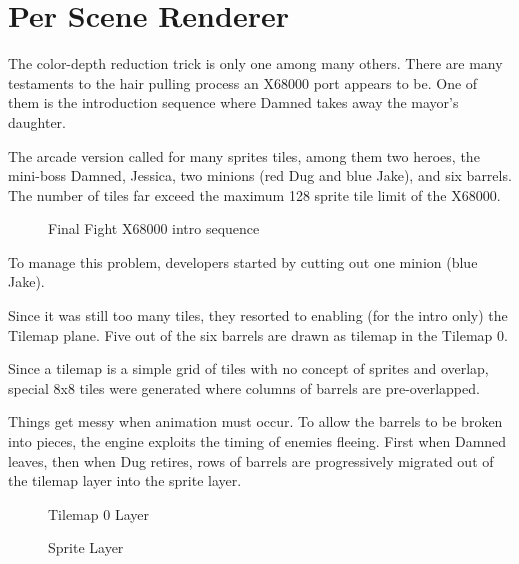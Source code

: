 \pagebreak

\section{Per Scene Renderer}

The color-depth reduction trick is only one among many others. There are many testaments to the hair pulling process an X68000 port appears to be. One of them is the introduction sequence where Damned takes away the mayor's daughter.

The arcade version called for many sprites tiles, among them two heroes, the mini-boss Damned, Jessica, two minions (red Dug and blue Jake), and six barrels. The number of tiles far exceed the maximum 128 sprite tile limit of the X68000.

\begin{figure}[H]
\caption*{Final Fight X68000 intro sequence}
\end{figure}

To manage this problem, developers started by cutting out one minion (blue Jake). 

Since it was still too many tiles, they resorted to enabling (for the intro only) the Tilemap plane. Five out of the six barrels are drawn as tilemap in the Tilemap 0.

Since a tilemap is a simple grid of tiles with no concept of sprites and overlap, special 8x8 tiles were generated where columns of barrels are pre-overlapped.

Things get messy when animation must occur. To allow the barrels to be broken into pieces, the engine exploits the timing of enemies fleeing. First when Damned leaves, then when Dug retires, rows of barrels are progressively migrated out of the tilemap layer into the sprite layer. 



\begin{minipage}[!t]{0.49\linewidth}
\vspace{-3mm}
  \begin{figure}[H]
  \caption*{Tilemap 0 Layer}
  \end{figure}
\end{minipage}%
\hfill
\begin{minipage}[!t]{0.49\linewidth}
\vspace{-3mm}
   \begin{figure}[H]
  \caption*{Sprite Layer}
  \end{figure}
\end{minipage}

